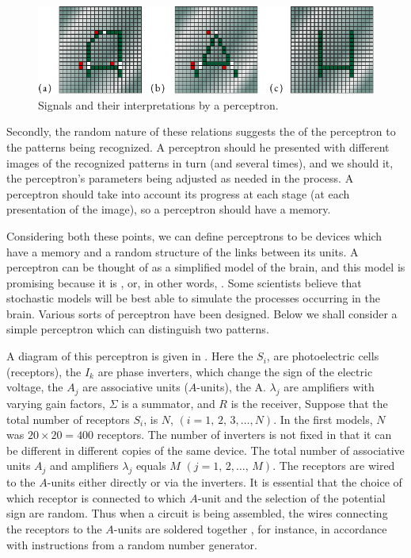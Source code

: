 \begin{figure}[!ht]
 \centering
 \includegraphics[width=\tfwidth]{figures/perceptron1.pdf}
\caption{Signals and their interpretations by a perceptron.\label{perceptron1}}
 \end{figure}
Secondly, the random nature of these relations suggests the 
of the perceptron to the patterns being recognized. A perceptron should
he presented with different images of the recognized patterns in turn
(and several times), and we should  it, the perceptron's parameters
being adjusted as needed in the process. A perceptron should take into
account its progress at each stage (at each presentation of the image), so
a perceptron should have a memory.

Considering both these points, we can define perceptrons to be
devices which have a memory and a random structure of the links
between its units. A perceptron can be thought of as a simplified model
of the brain, and this model is promising because it is , or,
in other words, . Some scientists believe that stochastic models will be best able to simulate the processes occurring in the brain.
Various sorts of perceptron have been designed. Below we shall
consider a simple perceptron which can distinguish two patterns.

 A diagram of this
perceptron is given in . Here the $S_{i}$, are photoelectric cells (receptors), the $I_{k}$ are phase inverters, which change the sign of the electric voltage, the $A_{j}$ are associative units ($A$-units), the A. $\lambda_{j}$ are amplifiers with varying gain factors, $\Sigma$ is a summator, and $R$ is the receiver, Suppose that the total number of receptors $S_{i}$, is $N$, $(i = 1, \, 2, \, 3, \ldots{} , N)$. In the first models, $N$ was $20 \times 20 = 400$ receptors. The number of inverters is not fixed in that it can be different in different copies of the same device. The total number of associative units $A_{j}$ and amplifiers $\lambda_{j}$ equals $M \,\, (j = 1, \, 2, \ldots{} ,\, M)$. The receptors are wired to the $A$-units either directly or via the inverters. It is essential that the choice of which receptor is connected to which $A$-unit and the selection of the potential sign are random. Thus when a circuit is being assembled, the wires connecting the receptors to the $A$-units are soldered together , for instance, in accordance with instructions from a random
number generator.

